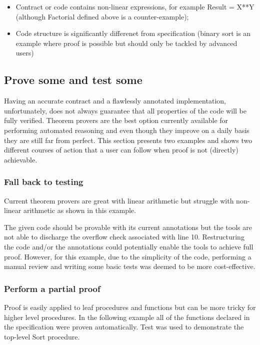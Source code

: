\documentclass{llncs}
\begin{document}
\begin{itemize}
   \item Contract or code contains non-linear expressions, for example 
         Result = X**Y (although Factorial defined above is a 
         counter-example);
   \item Code structure is significantly differenet from specification
         (binary sort is an example where proof is possible but
          should only be tackled by advanced users)
\end{itemize}


\subsection{Prove some and test some}
Having an accurate contract and a flawlessly annotated implementation,
unfortunately, does not always guarantee that all properties of the
code will be fully verified.  Theorem provers are the best option
currently available for performing automated reasoning and even though
they improve on a daily basis they are still far from perfect.  This
section presents two examples and shows two different courses of
action that a user can follow when proof is not (directly) achievable.

\subsubsection{Fall back to testing}
Current theorem provers are great with linear arithmetic but struggle
with non-linear arithmetic as shown in this example.

 The given code
should be provable with its current annotations but the tools are not
able to discharge the overflow check associated with line
10. Restructuring the code and/or the annotations could potentially
enable the tools to achieve full proof. However, for this example, due
to the simplicity of the code, performing a manual review and writing
some basic tests was deemed to be more cost-effective.

\subsubsection{Perform a partial proof}
Proof is easily applied to leaf procedures and functions but can be
more tricky for higher level procedures. In the following example all
of the functions declared in the specification were proven
automatically. Test was used to demonstrate the top-level Sort
procedure.


\end{document}

